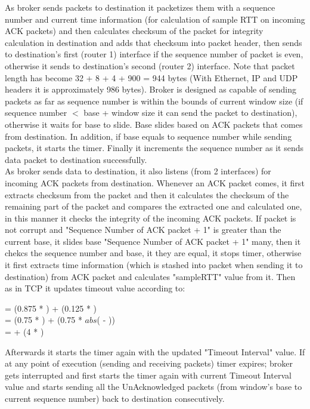 \documentclass[conference]{IEEEtran}
\begin{document}
As broker sends packets to destination it packetizes them with a sequence number and current time information (for calculation of sample RTT on incoming ACK packets) and then calculates checksum of the packet for integrity calculation in destination and adds that checksum into packet header, then sends to destination's first (router 1) interface if the sequence number of packet is even, otherwise it sends to destination's second (router 2) interface. Note that packet length has become 32 + 8 + 4 + 900 = 944 bytes (With Ethernet, IP and UDP headers it is approximately 986 bytes). Broker is designed as capable of sending packets as far as sequence number is within the bounds of current window size (if sequence number $<$ base + window size it can send the packet to destination), otherwise it waits for base to slide. Base slides based on ACK packets that comes from destination. In addition, if base equals to sequence number while sending packets, it starts the timer. Finally it increments the sequence number as it sends data packet to destination successfully. \\

As broker sends data to destination, it also listens (from 2 interfaces) for incoming ACK packets from destination. Whenever an ACK packet comes, it first extracts checksum from the packet and then it calculates the checksum of the remaining part of the packet and compares the extracted one and calculated one, in this manner it checks the integrity of the incoming ACK packets. If packet is not corrupt and "Sequence Number of ACK packet + 1" is greater than the current base, it slides base "Sequence Number of ACK packet + 1" many, then it chekcs the sequence number and base, it they are equal, it stops timer, otherwise it first extracts time information (which is stashed into packet when sending it to destination) from ACK packet and calculates "sampleRTT" value from it. Then as in TCP it updates timeout value according to: \\

\begin{center}
= (0.875 * ) + (0.125 * ) \\
 = (0.75 * ) + (0.75 * $abs$( - )) \\
 =  + (4 * ) \\
\end{center}

Afterwards it starts the timer again with the updated "Timeout Interval" value. If at any point of execution (sending and receiving packets) timer expires; broker gets interrupted and first starts the timer again with current Timeout Interval value and starts sending all the UnAcknowledged packets (from window's base to current sequence number) back to destination consecutively. \\
\end{document}
